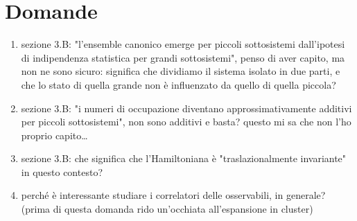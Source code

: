 \documentclass[a4paper,10pt,twocolumn]{article}
\begin{document}
\section{Domande}
\label{sec:dom}
\begin{enumerate}
	\item sezione 3.B: "l'ensemble canonico emerge per piccoli sottosistemi dall'ipotesi di indipendenza statistica per grandi sottosistemi", penso di aver capito, ma non ne sono sicuro: significa che dividiamo il sistema isolato in due parti, e che lo stato di quella grande non è influenzato da quello di quella piccola? 
	\item sezione 3.B: "i numeri di occupazione diventano approssimativamente additivi per piccoli sottosistemi", non sono additivi e basta? questo mi sa che non l'ho proprio capito\dots
	\item sezione 3.B: che significa che l'Hamiltoniana è "traslazionalmente invariante" in questo contesto?
	\item perché è interessante studiare i correlatori delle osservabili, in generale? (prima di questa domanda rido un'occhiata all'espansione in cluster)
\end{enumerate}
\end{document}
